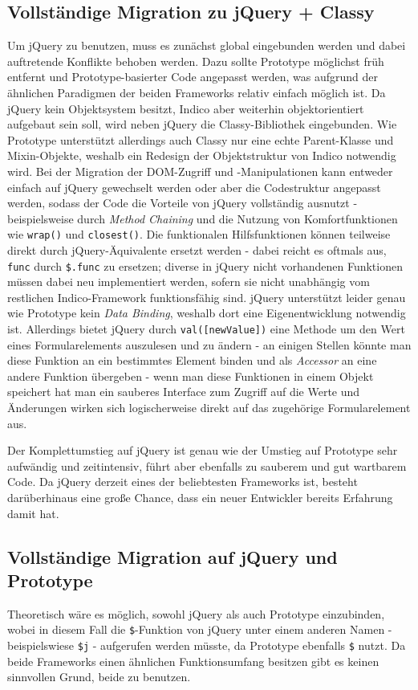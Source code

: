 \subsection{Vollständige Migration zu jQuery + Classy}
Um jQuery zu benutzen, muss es zunächst global eingebunden werden und dabei auftretende Konflikte
behoben werden. Dazu sollte Prototype möglichst früh entfernt und Prototype-basierter Code angepasst
werden, was aufgrund der ähnlichen Paradigmen der beiden Frameworks relativ einfach möglich ist.
Da jQuery kein Objektsystem besitzt, Indico aber weiterhin objektorientiert aufgebaut sein soll,
wird neben jQuery die Classy-Bibliothek eingebunden. Wie Prototype unterstützt allerdings auch
Classy nur eine echte Parent-Klasse und Mixin-Objekte, weshalb ein Redesign der Objektstruktur von
Indico notwendig wird. Bei der Migration der DOM-Zugriff und -Manipulationen kann entweder einfach
auf jQuery gewechselt werden oder aber die Codestruktur angepasst werden, sodass der Code die
Vorteile von jQuery vollständig ausnutzt - beispielsweise durch \emph{Method Chaining} und die
Nutzung von Komfortfunktionen wie \lstinline{wrap()} und \lstinline{closest()}. Die funktionalen
Hilfsfunktionen können teilweise direkt durch jQuery-Äquivalente ersetzt werden - dabei reicht es
oftmals aus, \lstinline{func} durch \lstinline{$.func} zu ersetzen; diverse in jQuery nicht
vorhandenen Funktionen müssen dabei neu implementiert werden, sofern sie nicht unabhängig vom
restlichen Indico-Framework funktionsfähig sind. jQuery unterstützt leider genau wie Prototype kein
\emph{Data Binding}, weshalb dort eine Eigenentwicklung notwendig ist. Allerdings bietet jQuery
durch \lstinline{val([newValue])} eine Methode um den Wert eines Formularelements auszulesen und zu
ändern - an einigen Stellen könnte man diese Funktion an ein bestimmtes Element binden und als
\emph{Accessor} an eine andere Funktion übergeben - wenn man diese Funktionen in einem Objekt
speichert hat man ein sauberes Interface zum Zugriff auf die Werte und Änderungen wirken sich
logischerweise direkt auf das zugehörige Formularelement aus.

Der Komplettumstieg auf jQuery ist genau wie der Umstieg auf Prototype sehr aufwändig und
zeitintensiv, führt aber ebenfalls zu sauberem und gut wartbarem Code. Da jQuery derzeit eines der
beliebtesten Frameworks ist, besteht darüberhinaus eine große Chance, dass ein neuer Entwickler
bereits Erfahrung damit hat.


\subsection{Vollständige Migration auf jQuery und Prototype}
Theoretisch wäre es möglich, sowohl jQuery als auch Prototype einzubinden, wobei in diesem Fall die
\lstinline{$}-Funktion von jQuery unter einem anderen Namen - beispielswiese \lstinline{$j} -
aufgerufen werden müsste, da Prototype ebenfalls \lstinline{$} nutzt. Da beide Frameworks einen
ähnlichen Funktionsumfang besitzen gibt es keinen sinnvollen Grund, beide zu benutzen.


